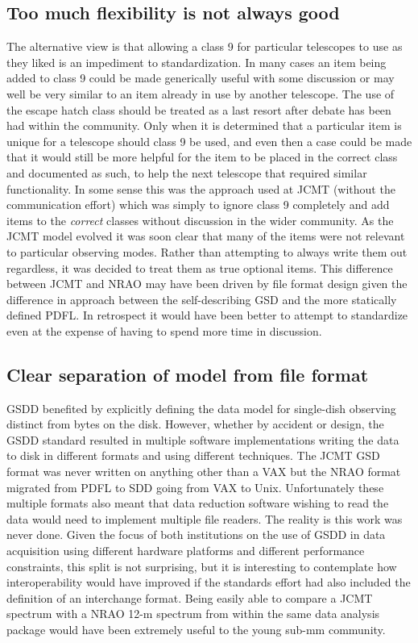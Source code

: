 \documentclass[final,authoryear,5p,times,twocolumn]{elsarticle}
\begin{document}
\subsection{Too much flexibility is not always good}

The alternative view is that allowing a class 9 for particular
telescopes to use as they liked is an impediment to
standardization. In many cases an item being added to class 9 could be
made generically useful with some discussion or may well be very
similar to an item already in use by another telescope. The use of the
escape hatch class should be treated as a last resort after debate has
been had within the community. Only when it is determined that a
particular item is unique for a telescope should class 9 be used, and
even then a case could be made that it would still be more helpful for
the item to be placed in the correct class and documented as such, to
help the next telescope that required similar functionality. In some
sense this was the approach used at JCMT (without the communication
effort) which was simply to ignore class 9 completely and add items to
the \emph{correct} classes without discussion in the wider
community. As the JCMT model evolved it was soon clear that many of
the items were not relevant to particular observing modes. Rather than
attempting to always write them out regardless, it was decided to
treat them as true optional items. This difference between JCMT and
NRAO may have been driven by file format design given the difference
in approach between the self-describing GSD and the more statically
defined PDFL.  In retrospect it would have been better to attempt to
standardize even at the expense of having to spend more time in
discussion.

\subsection{Clear separation of model from file format}

GSDD benefited by explicitly defining the
data model for single-dish observing distinct from bytes on the
disk. However, whether by accident or design, the GSDD standard resulted in multiple
software implementations writing the data to disk in different formats
and using different techniques. The JCMT GSD format was never written
on anything other than a VAX but the NRAO format migrated from PDFL to
SDD going from VAX to Unix. Unfortunately these multiple formats also
meant that data reduction software
wishing to read the data would need to implement multiple file
readers. The reality is this work was never done. Given the focus of
both institutions on the use of GSDD in data acquisition using
different hardware platforms and different performance constraints,
this split is not surprising, but it is interesting to contemplate how
interoperability would have improved if the standards effort had also
included the definition of an interchange format. Being easily able to
compare a JCMT spectrum with a NRAO 12-m spectrum from within the same
data analysis package would have been extremely useful to the young
sub-mm community.
\end{document}
